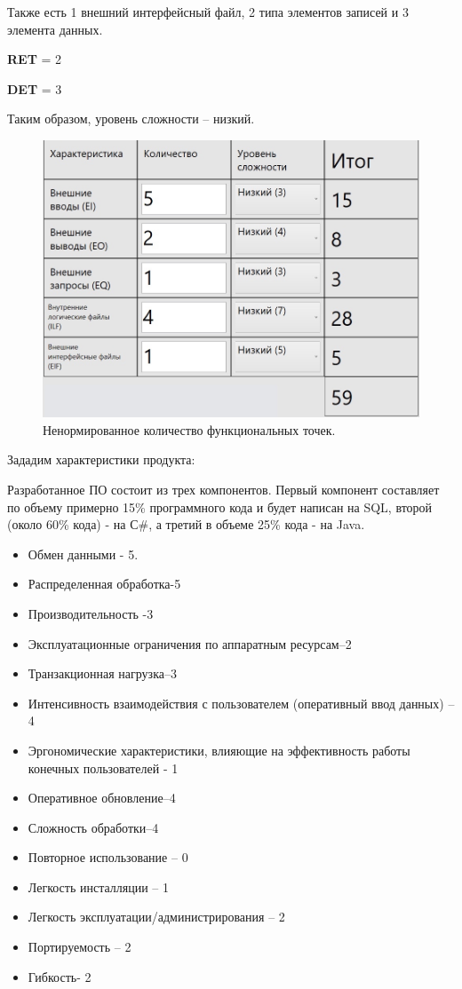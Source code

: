 \documentclass[a4paper,14pt]{extreport} %
\begin{document}
\begin{enumerate}
\begin{itemize}
Также есть 1 внешний интерфейсный файл, 2 типа элементов записей и 3 элемента данных. 

\textbf{RET} = 2

\textbf{DET} = 3

Таким образом, уровень сложности -- низкий.

\end{itemize}

 \begin{figure}[H]
  \centering
  \caption{Ненормированное количество функциональных точек. }
  \includegraphics[scale=0.5]{nenorm.jpg}
\end{figure}

Зададим характеристики продукта:

Разработанное ПО состоит из трех компонентов. Первый компонент составляет по объему примерно 15\% программного кода и будет написан на SQL, второй (около 60\% кода) - на С\#, а третий в объеме 25\% кода - на Java.

 
\begin{itemize}
\item Обмен данными - 5.
\item Распределенная обработка-5
\item Производительность -3
\item Эксплуатационные ограничения по аппаратным ресурсам–2
\item Транзакционная нагрузка–3
\item Интенсивность взаимодействия с пользователем (оперативный ввод данных) – 4
\item Эргономические характеристики, влияющие на эффективность работы конечных пользователей - 1
\item Оперативное обновление–4
\item Сложность обработки–4
\item Повторное использование – 0 
\item Легкость инсталляции – 1
\item Легкость эксплуатации/администрирования – 2 
\item Портируемость – 2
\item Гибкость- 2
\end{itemize}


\end{enumerate}
\end{document}
